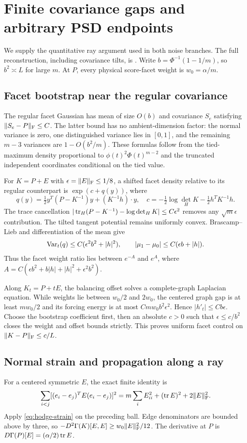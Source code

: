 \section{Finite covariance gaps and arbitrary PSD endpoints}
\label{sec:gap-proof}
We supply the quantitative ray argument used in both noise branches.
The full reconstruction, including covariance tilts, is \cite{currentgap}.
Write $b=\Phi^{-1}(1-1/m)$, so $b^2\asymp L$ for large $m$.
At $P$, every physical score-facet weight is $w_0=\alpha/m$.

\subsection{Facet bootstrap near the regular covariance}
The regular facet Gaussian has mean of size $O(b)$ and covariance
$S_e$ satisfying $\|S_e-P\|_\mathrm F\le C$. The latter bound has no
ambient-dimension factor: the normal variance is zero, one distinguished
variance lies in $[0,1]$, and the remaining $m-3$ variances are
$1-O(b^2/m)$. These formulas follow from the tied-maximum density
proportional to $\phi(t)^2\Phi(t)^{m-2}$ and the truncated independent
coordinates conditional on the tied value.

For $K=P+E$ with $\epsilon=\|E\|_\mathrm F\le1/8$, a shifted facet density
relative to its regular counterpart is $\exp(c+q(y))$, where
\[
 q(y)=\tfrac12y^T(P-K^{-1})y+(K^{-1}h)\cdot y,\quad
 c=-\tfrac12\log\det_HK-\tfrac12h^TK^{-1}h.
\]
The trace cancellation
$|\operatorname{tr}_H(P-K^{-1})-\log\det_HK|\le C\epsilon^2$ removes any
$\sqrt m\epsilon$ contribution. The tilted tangent potential remains
uniformly convex. Brascamp--Lieb and differentiation of the mean give
\[
 \operatorname{Var}_t(q)\le C(\epsilon^2b^2+|h|^2),\qquad
 |\mu_1-\mu_0|\le C(\epsilon b+|h|).
\]
Thus the facet weight ratio lies between $e^{-A}$ and $e^A$, where
$A=C(\epsilon b^2+b|h|+|h|^2+\epsilon^2b^2)$.

Along $K_t=P+tE$, the balancing offset solves a complete-graph
Laplacian equation. While weights lie between $w_0/2$ and $2w_0$,
the centered graph gap is at least $mw_0/2$ and its forcing energy is
at most $Cmw_0b^2\epsilon^2$. Hence $|h'_t|\le Cb\epsilon$.
Choose the bootstrap coefficient first, then an absolute $c>0$ such that
$\epsilon\le c/b^2$ closes the weight and offset bounds strictly.
This proves uniform facet control on $\|K-P\|_\mathrm F\le c/L$.

\subsection{Normal strain and propagation along a ray}
For a centered symmetric $E$, the exact finite identity is
\begin{equation}\label{eq:edge-identity}
 \sum_{i<j}[(e_i-e_j)^TE(e_i-e_j)]^2
 =m\sum_i E_{ii}^2+(\operatorname{tr} E)^2+2\|E\|_\mathrm F^2.
\end{equation}
Apply \eqref{eq:hodge-strain} on the preceding ball. Edge denominators
are bounded above by three, so
$-D^2\Gamma(K)[E,E]\ge w_0\|E\|_\mathrm F^2/12$.
The derivative at $P$ is $D\Gamma(P)[E]=(\alpha/2)\operatorname{tr} E$.

